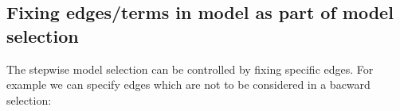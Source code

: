 \documentclass[12pt]{article}
\begin{document}














\subsection{Fixing edges/terms in model as part of model selection}
\label{sec:xxx}

The stepwise model selection can be controlled by fixing specific
edges. For example we can specify edges which are not to be considered
in a bacward selection:
\end{document}
